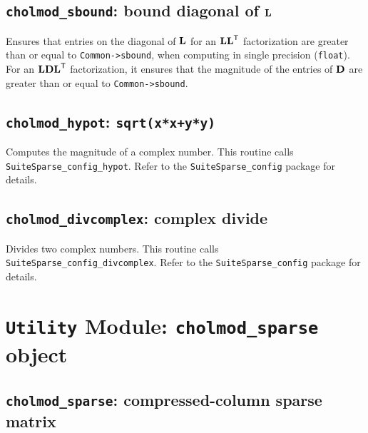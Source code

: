 \documentclass[11pt]{article}
\newcommand{\m}[1]{{\bf{#1}}}       %
\newcommand{\tr}{^{\sf T}}          %
\begin{document}
\subsection{{\tt cholmod\_sbound}: bound diagonal of $\m{L}$}


Ensures that entries on the diagonal of $\m{L}$ for an $\m{LL}\tr$
factorization are greater than or equal to {\tt Common->sbound}, when computing
in single precision ({\tt float}).  For an $\m{LDL}\tr$ factorization, it
ensures that the magnitude of the entries of $\m{D}$ are greater than or equal
to {\tt Common->sbound}.

\subsection{{\tt cholmod\_hypot}: {\tt sqrt(x*x+y*y)}}


Computes the magnitude of a complex number.
This routine calls {\tt SuiteSparse\_config\_hypot}.  Refer to the
{\tt SuiteSparse\_config} package for details.

\subsection{{\tt cholmod\_divcomplex}: complex divide}


Divides two complex numbers.
This routine calls {\tt SuiteSparse\_config\_divcomplex}.  Refer to the
{\tt SuiteSparse\_config} package for details.

\newpage \section{{\tt Utility} Module: {\tt cholmod\_sparse} object}
\label{cholmod_sparse}

\subsection{{\tt cholmod\_sparse}: compressed-column sparse matrix}
\end{document}
